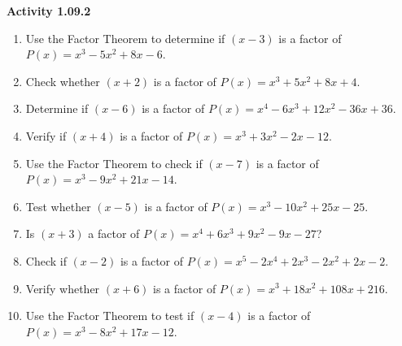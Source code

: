 \vspace{0.3ex}
\noindent\textbf{Activity 1.09.2}

\vspace{0.2ex}

\begin{enumerate}
    \item Use the Factor Theorem to determine if \( (x - 3) \) is a factor of \( P(x) = x^3 - 5x^2 + 8x - 6 \).
    \item Check whether \( (x + 2) \) is a factor of \( P(x) = x^3 + 5x^2 + 8x + 4 \).
    \item Determine if \( (x - 6) \) is a factor of \( P(x) = x^4 - 6x^3 + 12x^2 - 36x + 36 \).
    \item Verify if \( (x + 4) \) is a factor of \( P(x) = x^3 + 3x^2 - 2x - 12 \).
    \item Use the Factor Theorem to check if \( (x - 7) \) is a factor of \( P(x) = x^3 - 9x^2 + 21x - 14 \).
    \item Test whether \( (x - 5) \) is a factor of \( P(x) = x^3 - 10x^2 + 25x - 25 \).
    \item Is \( (x + 3) \) a factor of \( P(x) = x^4 + 6x^3 + 9x^2 - 9x - 27 \)?
    \item Check if \( (x - 2) \) is a factor of \( P(x) = x^5 - 2x^4 + 2x^3 - 2x^2 + 2x - 2 \).
    \item Verify whether \( (x + 6) \) is a factor of \( P(x) = x^3 + 18x^2 + 108x + 216 \).
    \item Use the Factor Theorem to test if \( (x - 4) \) is a factor of \( P(x) = x^3 - 8x^2 + 17x - 12 \).
\end{enumerate}